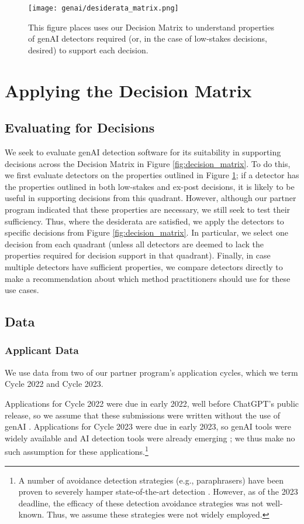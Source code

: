 \begin{figure}[htbp]
  \centering
  \texttt{[image: genai/desiderata\_matrix.png]}
  \caption{This figure places uses our Decision Matrix to understand properties of genAI detectors required (or, in the case of low-stakes decisions, desired) to support each decision.}
  \label{fig:desiderata_matrix}
\end{figure}

\section{Applying the Decision Matrix}\label{sec:data}
\subsection{Evaluating for Decisions}
We seek to evaluate genAI detection software for its suitability in supporting decisions across the Decision Matrix in Figure \ref{fig:decision_matrix}. To do this, we first evaluate detectors on the properties outlined in Figure \ref{fig:desiderata_matrix}; if a detector has the properties outlined in both low-stakes and ex-post decisions, it is likely to be useful in supporting decisions from this quadrant. However, although our partner program indicated that these properties are necessary, we still seek to test their sufficiency. Thus, where the desiderata are satisfied, we apply the detectors to specific decisions from Figure \ref{fig:decision_matrix}. In particular, we select one decision from each quadrant (unless all detectors are deemed to lack the properties required for decision support in that quadrant). Finally, in case multiple detectors have sufficient properties, we compare detectors directly to make a recommendation about which method practitioners should use for these use cases.

\subsection{Data}
\subsubsection{Applicant Data}\label{sssec:applicant_data}
We use data from two of our partner program's application cycles, which we term Cycle 2022 and Cycle 2023.

Applications for Cycle 2022 were due in early 2022, well before ChatGPT's public release, so we assume that these submissions were written without the use of genAI \cite{openai_gpt-4_2023}. Applications for Cycle 2023 were due in early 2023, so genAI tools were widely available and AI detection tools were already emerging \cite{kirchner_new_2023,gptzero_gptzero_2023,liu_deid-gpt_2023}; we thus make no such assumption for these applications.\footnote{A number of avoidance detection strategies (e.g., paraphrasers) have been proven to severely hamper state-of-the-art detection \cite{kalpesh_krishna_paraphrasing_2023}. However, as of the 2023 deadline, the efficacy of these detection avoidance strategies was not well-known. Thus, we assume these strategies were not widely employed.}

